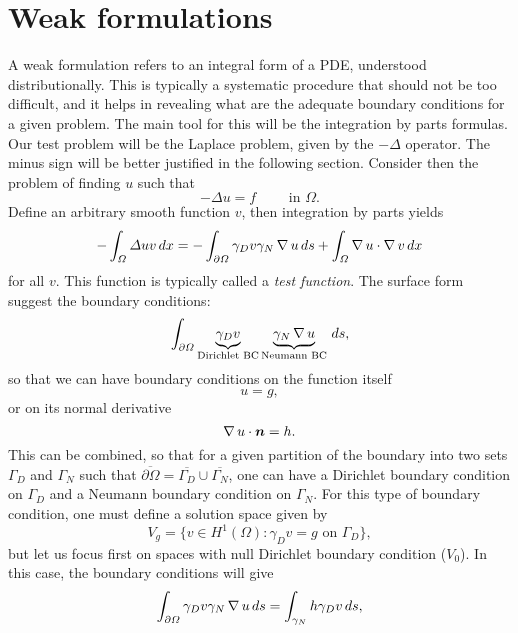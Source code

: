 \section{Weak formulations}
A weak formulation refers to an integral form of a PDE, understood distributionally. This is typically a systematic procedure that should not be too difficult, and it helps in revealing what are the adequate boundary conditions for a given problem. The main tool for this will be the integration by parts formulas. Our test problem will be the Laplace problem, given by the $-\Delta$ operator. The minus sign will be better justified in the following section. Consider then the problem of finding $u$ such that 
    \begin{equation*}
-\Delta u = f \qquad \text{ in $\Omega$}.
\end{equation*}
Define an arbitrary smooth function $v$, then integration by parts yields
    \begin{equation*}
- \int_\Omega \Delta u v\,dx = -\int_{\partial\Omega}\gamma_D v \gamma_N \operatorname{\nabla} u \,ds + \int_\Omega \operatorname{\nabla} u \cdot \operatorname{\nabla} v\,dx
\end{equation*}
for all $v$. This function is typically called a \emph{test function}. The surface form suggest the boundary conditions: 
    \begin{equation*}
\int_{\partial\Omega}\underbrace{\gamma_D v}_\text{Dirichlet BC} \underbrace{\gamma_N \operatorname{\nabla} u}_\text{Neumann BC} \,ds,
\end{equation*}
so that we can have boundary conditions on the function itself  
    \begin{equation*}
u = g,
\end{equation*}
or on its normal derivative
    \begin{equation*}
\grad u \cdot \vec n = h.
\end{equation*}
This can be combined, so that for a given partition of the boundary into two sets $\Gamma_D$ and $\Gamma_N$ such that $\overline{\partial\Omega} = \overline{\Gamma_D}\cup\overline{\Gamma_N}$, one can have a Dirichlet boundary condition on $\Gamma_D$ and a Neumann boundary condition on $\Gamma_N$. For this type of boundary condition, one must define a solution space given by 
    \begin{equation*}
V_g = \{v \in H^1(\Omega): \gamma_D v = g \text{ on $\Gamma_D$}\},
\end{equation*}
but let us focus first on spaces with null Dirichlet boundary condition ($V_0$). In this case, the boundary conditions will give
    \begin{equation*}
\int_{\partial\Omega}\gamma_Dv \gamma_N \operatorname{\nabla} u\,ds = \int_{\gamma_N} h \gamma_D v\,ds,
\end{equation*}
